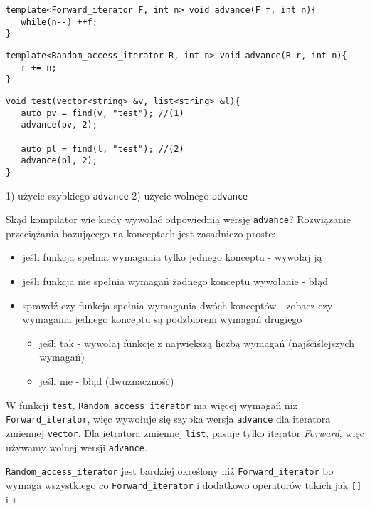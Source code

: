 \documentclass[11pt, a4paper]{article}
\begin{document}
\begin{lstlisting}[frame=single]
template<Forward_iterator F, int n> void advance(F f, int n){
   while(n--) ++f;
}
\end{lstlisting}

\begin{lstlisting}[frame=single]
template<Random_access_iterator R, int n> void advance(R r, int n){
   r += n;
}
\end{lstlisting}

\begin{lstlisting}[frame=single]
void test(vector<string> &v, list<string> &l){
   auto pv = find(v, "test"); //(1)
   advance(pv, 2);
   
   auto pl = find(l, "test"); //(2)
   advance(pl, 2);
}
\end{lstlisting}

1) użycie szybkiego \verb#advance#
2) użycie wolnego \verb#advance#\newline

Skąd kompilator wie kiedy wywołać odpowiednią wersję \verb#advance#? Rozwiązanie przeciążania bazującego na konceptach jest zasadniczo proste:

\begin{itemize}
\item jeśli funkcja spełnia wymagania tylko jednego konceptu - wywołaj ją
\item jeśli funkcja nie spełnia wymagań żadnego konceptu wywołanie - błąd
\item sprawdź czy funkcja spełnia wymagania dwóch konceptów - zobacz czy wymagania jednego
konceptu są podzbiorem wymagań drugiego
\begin{itemize}
\item jeśli tak - wywołaj funkcję z największą liczbą wymagań (najściślejszych wymagań)
\item jeśli nie - błąd (dwuznaczność)
\end{itemize}
\end{itemize}

W funkcji \verb#test#, \verb#Random_access_iterator# ma więcej wymagań niż \verb#Forward_iterator#, więc wywołuje się szybka wersja \verb#advance# dla iteratora zmiennej \verb#vector#. Dla ietratora zmiennej \verb#list#, pasuje tylko iterator \emph{Forward}, więc używamy wolnej wersji \verb#advance#.

\verb#Random_access_iterator# jest bardziej określony niż \verb#Forward_iterator# bo wymaga wszystkiego co 
\verb#Forward_iterator# i dodatkowo operatorów takich jak \verb#[]# i \verb#+#.
\end{document}
